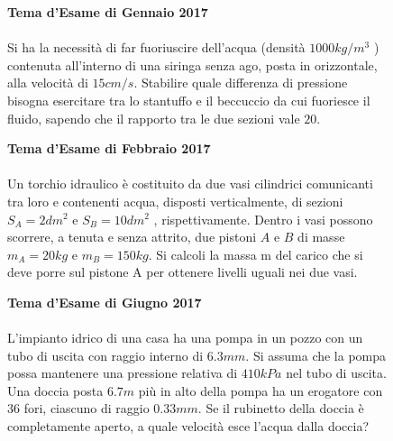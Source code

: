 \begin{figure}[h!]
    \textbf{Tema d'Esame di Gennaio 2017}\\ \\
    Si ha la necessità di far fuoriuscire dell'acqua (densità $1000 kg/m^3$
    ) contenuta all'interno di una siringa senza ago, posta in orizzontale, alla velocità di $15 cm/s$.
     Stabilire quale differenza di pressione bisogna esercitare tra lo stantuffo e il beccuccio da cui fuoriesce il
    fluido, sapendo che il rapporto tra le due sezioni vale $20$. 
\end{figure}

\begin{figure}[h!]
    \textbf{Tema d'Esame di Febbraio 2017}\\ \\
    Un torchio idraulico è costituito da due vasi cilindrici comunicanti tra loro e contenenti acqua, disposti verticalmente, di sezioni $S_A =2 dm^2$  e $S_B = 10 dm^2$ , rispettivamente. Dentro i vasi possono scorrere, a tenuta e senza attrito, due pistoni $A$ e $B$ di masse $m_A = 20 kg$ e $m_B = 150 kg$. Si calcoli la massa m del carico che si deve porre sul pistone A per ottenere livelli uguali nei due vasi.
\end{figure}

\begin{figure}[h!]
    \textbf{Tema d'Esame di Giugno 2017}\\ \\
    L’impianto idrico di una casa ha una pompa in un pozzo con un tubo di uscita con raggio interno di $6.3 mm$. Si assuma che la pompa possa mantenere una pressione relativa di $410 kPa$ nel tubo di uscita. Una doccia posta $6.7 m$ più in alto della pompa ha un erogatore con $36$ fori, ciascuno di raggio $0.33 mm$. Se il rubinetto della doccia è completamente aperto, a quale velocità esce l’acqua dalla doccia?
\end{figure}